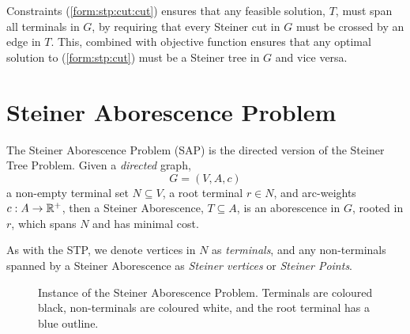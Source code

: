  Constraints (\ref{form:stp:cut:cut}) ensures that any feasible solution, $T$,  must span all terminals in $G$, by
 requiring that every Steiner cut in $G$ must be crossed by an edge in $T$. This, combined with objective function
  ensures that any optimal solution to (\ref{form:stp:cut}) must be a Steiner tree in $G$ and vice versa.

\section{Steiner Aborescence Problem}
The Steiner Aborescence Problem (SAP) is the directed version of the Steiner Tree Problem.
Given a \textit{directed} graph,
$$G = (V, A, c)$$
a non-empty terminal set $N \subseteq V$, a root terminal $r \in N$, and arc-weights $c : A \to \mathbb{R}^+$,
then a Steiner Aborescence, $T \subseteq A$, is an aborescence
in $G$, rooted in $r$, which spans $N$ and has minimal cost.

As with the STP, we denote vertices in $N$ as \textit{terminals}, and any non-terminals spanned by a Steiner Aborescence as
 \textit{Steiner vertices} or \textit{Steiner Points}.
\begin{figure}[h]\centering
{}
\caption{Instance of the Steiner Aborescence Problem. Terminals are coloured black, non-terminals are coloured white, and the root terminal
  has a blue outline.}
\label{fig:sap:01}
\end{figure}

